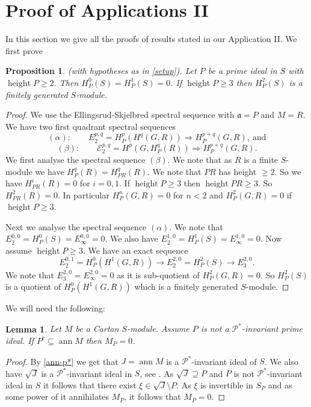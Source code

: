 \documentclass{amsart}
\newcommand{\A}{\mathfrak{a} }
\newcommand{\Pc}{\mathcal{P} }
\newcommand{\rt}{\rightarrow}
\newcommand{\ann}{\operatorname{ann}}
\newcommand{\height}{\operatorname{height}}
\theoremstyle{plain}
\newtheorem{lemma}[theorem]{Lemma}
\newtheorem{proposition}[theorem]{Proposition}
\theoremstyle{definition}
\theoremstyle{remark}
\begin{document}
\section{Proof of Applications II}
In this section we give all the proofs of results stated in our Application II.
We first prove
\begin{proposition}
\label{rachel}(with hypotheses as in \ref{setup}). Let $P$ be a prime ideal in $S$ with $\height P \geq 2$. Then $H^0_P(S) = H^1_P(S) = 0$.  If $\height P \geq 3$ then $H^2_P(S)$ is a finitely generated $S$-module.
\end{proposition}
\begin{proof}
We use the Ellingsrud-Skjelbred  spectral sequence with $\A = P$ and $M = R$. We have two first quadrant spectral sequences
\[
(\alpha)\colon \quad \quad  E_2^{p,q} = H^p_{P}(H^q(G, R)) \Longrightarrow H^{p+q}_{P}(G,R), \ \text{and}
\]
\[
(\beta)\colon \quad \quad \mathcal{E}_2^{p,q} = H^p(G, H^q_{P}(R)) \Longrightarrow H^{p+q}_{P}(G,R).
\]
We first analyse the spectral sequence $(\beta)$. We note that as $R$ is a finite $S$-module we have $H^q_{P}(R) = H^q_{PR}(R)$. We note that $PR$ has height $\geq 2$. So we have $H^i_{PR}(R) = 0$
for $i = 0, 1$.  If $\height P \geq 3$ then $\height PR \geq 3$. So $H^2_{PR}(R) = 0$. In particular $H^n_{P}(G, R) = 0$ for $n < 2$ and $H^2_{P}(G, R) = 0$ if $\height P \geq 3$.

Next we analyse the spectral sequence $(\alpha)$. We note that $E_2^{0,0} = H^0_P(S) = E_\infty^{0,0} = 0$. We also have $E_2^{1,0} = H^1_P(S) = E_\infty^{1,0} = 0$. Now assume $\height P \geq 3$.
We have an exact sequence
$$ E_2^{0, 1} = H^0_P(H^1(G, R))  \rt E_2^{2, 0} = H^2_P(S) \rt E_3^{2,0}.$$
We note that $E_3^{2,0} = E_\infty^{2,0} = 0$ as it is sub-quotient of $H^2_{P}(G, R) = 0$. So $H^2_P(S)$ is a quotient of $H^0_P(H^1(G, R))$ which is a finitely generated $S$-module.
\end{proof}
We will need the following:
\begin{lemma}
\label{eclair} Let $M$ be a Cartan $S$-module. Assume $P$ is not a $\Pc^*$-invariant prime ideal. If $P^r \subseteq \ann M$ then $M_P = 0$.
\end{lemma}
\begin{proof}
By \ref{ann-p*} we get that $J = \ann M$ is a $\Pc^*$-invariant ideal of $S$. We also have $\sqrt{J}$ is a $\Pc^*$-invariant ideal in $S$, see \cite[11.2.5]{SL}. As $\sqrt{J}  \supseteq P$ and $P$ is not $\Pc^*$-invariant ideal in $S$ it follows that there exist $\xi \in \sqrt{J} \setminus P$. As $\xi$ is invertible in $S_P$ and as some power of it annihilates $M_P$, it follows that $M_P = 0$.
\end{proof}
\end{document}
